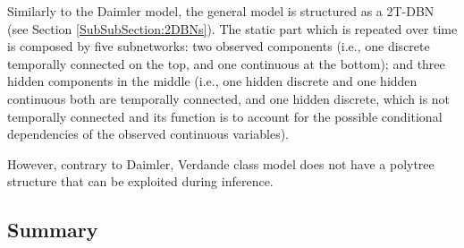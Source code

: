 
Similarly to the Daimler model, the general model is structured as a 2T-DBN (see Section \ref{SubSubSection:2DBNs}). The static part which is repeated over time is composed by five subnetworks: two observed components (i.e., one discrete temporally connected on the top, and one continuous at the bottom); and three hidden components in the middle (i.e., one hidden discrete and one hidden continuous both are temporally connected, and one hidden discrete, which is not temporally connected and its function is to account for the possible conditional dependencies of the observed continuous variables).  

However, contrary to Daimler, Verdande class model does not have a polytree structure that can be exploited during inference. 


\subsection{Summary}

 



%
